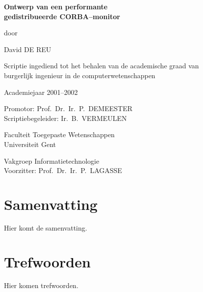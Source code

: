 
\newpage

{
\setlength{\baselineskip}{14pt}
\setlength{\parindent}{0pt}
\setlength{\parskip}{8pt}

\begin{center}

\noindent \textbf{\huge
Ontwerp van een performante\\[8pt]
gedistribueerde CORBA--monitor
}

door 

David DE REU

Scriptie ingediend tot het behalen van de academische graad van\\
burgerlijk ingenieur in de computerwetenschappen

Academiejaar 2001--2002

Promotor: Prof.~Dr.~Ir.~P.~DEMEESTER\\
Scriptiebegeleider: Ir.~B.~VERMEULEN

Faculteit Toegepaste Wetenschappen\\
Universiteit Gent

Vakgroep Informatietechnologie\\
Voorzitter: Prof.~Dr.~Ir.~P.~LAGASSE

\end{center}

\section*{Samenvatting}


Hier komt de samenvatting.


\section*{Trefwoorden}


Hier komen trefwoorden.

}

\newpage %
